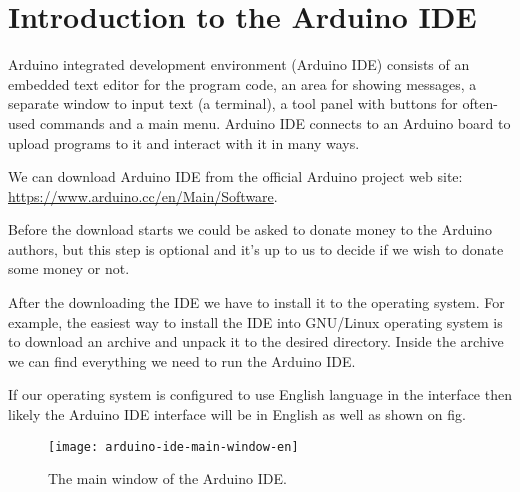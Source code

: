 \documentclass[../main.tex]{subfiles}
\begin{document}
\section{Introduction to the Arduino IDE}
Arduino integrated development environment (Arduino IDE) consists of an embedded
text editor for the program code, an area for showing messages, a separate
window to input text (a terminal), a tool panel with buttons for often-used
commands and a main menu.  Arduino IDE connects to an Arduino board to upload
programs to it and interact with it in many ways.

We can download Arduino IDE from the official Arduino project web site:
\url{https://www.arduino.cc/en/Main/Software}.

Before the download starts we could be asked to donate money to the Arduino
authors, but this step is optional and it's up to us to decide if we wish to
donate some money or not.

After the downloading the IDE we have to install it to the operating system.
For example, the easiest way to install the IDE into GNU/Linux operating system
is to download an archive and unpack it to the desired directory.  Inside the
archive we can find everything we need to run the Arduino IDE.

If our operating system is configured to use English language in the interface
then likely the Arduino IDE interface will be in English as well as shown on fig.

\begin{figure}[ht]
  \centering
  \caption{The main window of the Arduino IDE.}
  \texttt{[image: arduino-ide-main-window-en]}
  \label{fig:arduino-ide-main-window-en}
\end{figure}
\end{document}
